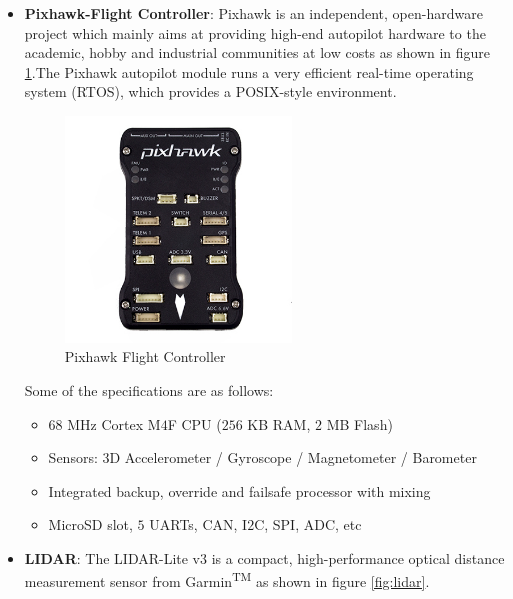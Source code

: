 \documentclass[12pt]{report}
\begin{document}
\begin{itemize}
\item \textbf{Pixhawk-Flight Controller}: Pixhawk is an independent, open-hardware project which mainly aims at providing high-end autopilot hardware to the academic, hobby and industrial communities at low costs as shown in figure \ref{fig:pixhawk}.The Pixhawk autopilot module runs a very efficient real-time operating system (RTOS), which provides a POSIX-style environment.
\begin{figure}[H]
	\centering 
    \includegraphics[width=6cm]{pixhawk.jpg}
	\caption{Pixhawk Flight Controller}
   \label{fig:pixhawk}
\end{figure}

Some of the specifications are as follows:
\begin {itemize}
\item $68$ MHz Cortex M$4$F CPU ($256$ KB RAM, $2$ MB Flash)
\item Sensors: $3$D Accelerometer / Gyroscope / Magnetometer / Barometer
\item Integrated backup, override and failsafe processor with mixing
\item MicroSD slot, $5$ UARTs, CAN, I$2$C, SPI, ADC, etc
\end{itemize}

\item \textbf{LIDAR}: The LIDAR-Lite v$3$ is a compact, high-performance optical distance measurement sensor from Garmin\textsuperscript{TM} as shown in figure \ref{fig:lidar}.


\end{itemize}
\end{document}
